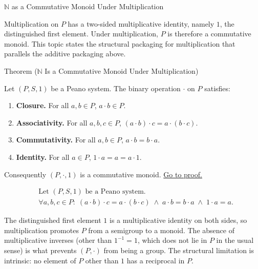 \begin{topicbox}{$\mathbb{N}$ as a Commutative Monoid Under Multiplication}
\begin{exposition}
Multiplication on $P$ has a two-sided multiplicative identity, namely $1$,
the distinguished first element. Under multiplication, $P$ is therefore a
commutative monoid. This topic states the structural packaging for multiplication
that parallels the additive packaging above.
\end{exposition}

\begin{theorembox}{Theorem ($\mathbb{N}$ Is a Commutative Monoid Under Multiplication)}
\begin{theorem}
\label{thm:n-multiplicative-monoid}
Let $(P,S,1)$ be a Peano system. The binary operation $\cdot$ on $P$ satisfies:
\begin{enumerate}
  \item \textbf{Closure.} For all $a,b \in P$, $a \cdot b \in P$.
  \item \textbf{Associativity.} For all $a,b,c \in P$,
  $(a \cdot b) \cdot c = a \cdot (b \cdot c)$.
  \item \textbf{Commutativity.} For all $a,b \in P$,
  $a \cdot b = b \cdot a$.
  \item \textbf{Identity.} For all $a \in P$,
  $1 \cdot a = a = a \cdot 1$.
\end{enumerate}
Consequently $(P, \cdot, 1)$ is a commutative monoid.
\hyperref[prf:n-multiplicative-monoid]{Go to proof.}
\end{theorem}
\end{theorembox}

\begin{remark*}
\[
\begin{aligned}
&\text{Let } (P,S,1) \text{ be a Peano system.}\\
&\forall a,b,c \in P:\;
(a \cdot b) \cdot c = a \cdot (b \cdot c)
\;\land\;
a \cdot b = b \cdot a
\;\land\;
1 \cdot a = a.
\end{aligned}
\]
\end{remark*}

\begin{remark*}[Interpretation]
The distinguished first element $1$ is a multiplicative identity on both
sides, so multiplication promotes $P$ from a semigroup to a monoid. The
absence of multiplicative inverses (other than $1^{-1} = 1$, which does not
lie in $P$ in the usual sense) is what prevents $(P,\cdot)$ from being a
group. The structural limitation is intrinsic: no element of $P$ other than
$1$ has a reciprocal in $P$.
\end{remark*}


\end{topicbox}

